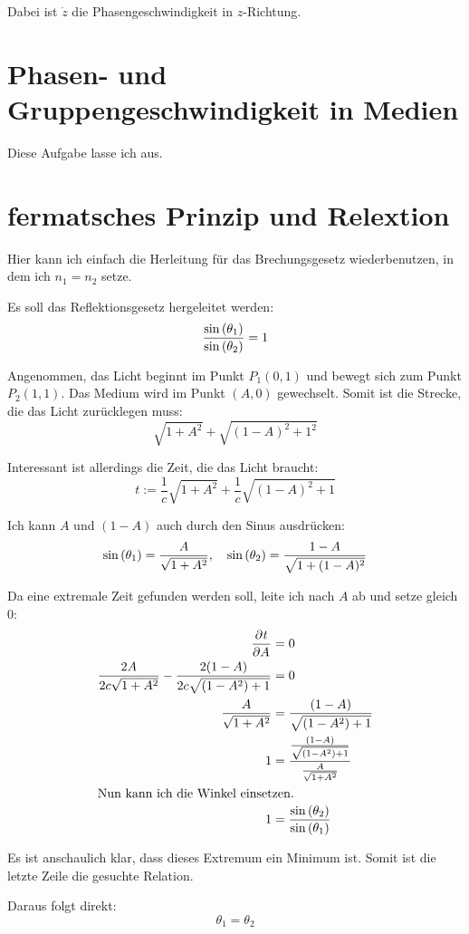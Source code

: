 \documentclass[11pt, ngerman, fleqn]{article}
\begin{document}
Dabei ist $\dot z$ die Phasengeschwindigkeit in $z$-Richtung.


\section{Phasen- und Gruppengeschwindigkeit in Medien}

Diese Aufgabe lasse ich aus.


\section{fermatsches Prinzip und Relextion}

Hier kann ich einfach die Herleitung für das Brechungsgesetz wiederbenutzen, in dem ich $n_1 = n_2$ setze.

Es soll das Reflektionsgesetz hergeleitet werden:
\[ \frac{\sin\del{\theta_1}}{\sin\del{\theta_2}} = 1 \]

Angenommen, das Licht beginnt im Punkt $P_1(0, 1)$ und bewegt sich zum Punkt
$P_2(1, 1)$. Das Medium wird im Punkt $(A, 0)$ gewechselt. Somit ist die Strecke, die das Licht zurücklegen muss:
\[ \sqrt{1 + A^2} + \sqrt{(1-A)^2 + 1^2} \]

Interessant ist allerdings die Zeit, die das Licht braucht:
\[ t := \frac 1{c} \sqrt{1 + A^2} + \frac 1{c} \sqrt{(1-A)^2 + 1} \]

Ich kann $A$ und $(1-A)$ auch durch den Sinus ausdrücken:
\[
	\sin\del{\theta_1} = \frac{A}{\sqrt{1 + A^2}}
	, \quad
	\sin\del{\theta_2} = \frac{1 - A}{\sqrt{1 + (1-A)^2}}
\]

Da eine extremale Zeit gefunden werden soll, leite ich nach $A$ ab und setze
gleich $0$:
%
\begin{align*}
\dpd t A &= 0 \\
\frac{2A}{2 c \sqrt{1+A^2}} - \frac{2(1-A)}{2 c \sqrt{(1-A^2)+1}} &= 0 \\
\frac{A}{\sqrt{1+A^2}} &= \frac{(1-A)}{\sqrt{(1-A^2)+1}} \\
1 &= \frac{\frac{(1-A)}{\sqrt{(1-A^2)+1}}}{\frac{A}{\sqrt{1+A^2}}} \\
\intertext{Nun kann ich die Winkel einsetzen.}
1 &= \frac{\sin\del{\theta_2}}{\sin\del{\theta_1}}
\end{align*}

Es ist anschaulich klar, dass dieses Extremum ein Minimum ist. Somit ist die
letzte Zeile die gesuchte Relation.

Daraus folgt direkt:
\[ \theta_1 = \theta_2 \]

%
%
\end{document}
